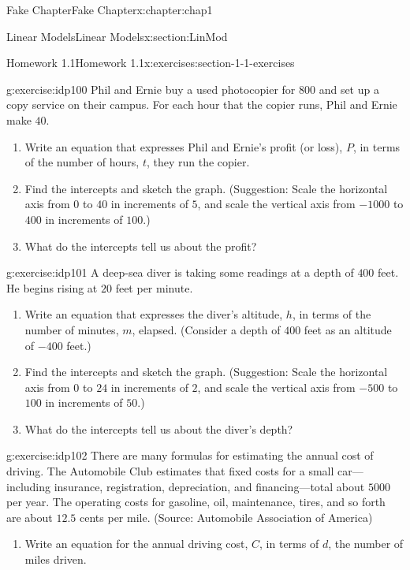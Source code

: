 \documentclass[oneside,10pt,]{book}
\numberwithin{equation}{section}
\begin{document}
\begin{chapterptx}{Fake Chapter}{}{Fake Chapter}{}{}{x:chapter:chap1}
\begin{sectionptx}{Linear Models}{}{Linear Models}{}{}{x:section:LinMod}
\begin{exercises-subsection}{Homework 1.1}{}{Homework 1.1}{}{}{x:exercises:section-1-1-exercises}
\begin{divisionexercise}{5}{}{}{g:exercise:idp100}%
Phil and Ernie buy a used photocopier for \textdollar{}\(800\) and set up a copy service on their campus. For each hour that the copier runs, Phil and Ernie make \textdollar{}\(40\).%
\begin{enumerate}[label=\alph*]
\item{}Write an equation that expresses Phil and Ernie's profit (or loss), \(P\), in terms of the number of hours, \(t\), they run the copier.%
\item{}Find the intercepts and sketch the graph. (Suggestion: Scale the horizontal axis from \(0\) to \(40\) in increments of \(5\), and scale the vertical axis from \(-1000\) to \(400\) in increments of \(100\).)%
\item{}What do the intercepts tell us about the profit?%
\end{enumerate}
%
\end{divisionexercise}%
\begin{divisionexercise}{6}{}{}{g:exercise:idp101}%
A deep-sea diver is taking some readings at a depth of \(400\) feet. He begins rising at \(20\) feet per minute.%
\begin{enumerate}[label=\alph*]
\item{}Write an equation that expresses the diver’s altitude, \(h\), in terms of the number of minutes, \(m\), elapsed. (Consider a depth of \(400\) feet as an altitude of \(-400\) feet.)%
\item{}Find the intercepts and sketch the graph. (Suggestion: Scale the horizontal axis from \(0\) to \(24\) in increments of \(2\), and scale the vertical axis from \(-500\) to \(100\) in increments of \(50\).)%
\item{}What do the intercepts tell us about the diver's depth?%
\end{enumerate}
%
\end{divisionexercise}%
\begin{divisionexercise}{7}{}{}{g:exercise:idp102}%
There are many formulas for estimating the annual cost of driving. The Automobile Club estimates that fixed costs for a small car—including insurance, registration, depreciation, and financing—total about \textdollar{}\(5000\) per year. The operating costs for gasoline, oil, maintenance, tires, and so forth are about \(12.5\) cents per mile. (Source: Automobile Association of America)%
\begin{enumerate}[label=\alph*]
\item{}Write an equation for the annual driving cost, \(C\), in terms of \(d\), the number of miles driven.%

\end{enumerate}
\end{divisionexercise}
\end{exercises-subsection}
\end{sectionptx}
\end{chapterptx}
\end{document}

